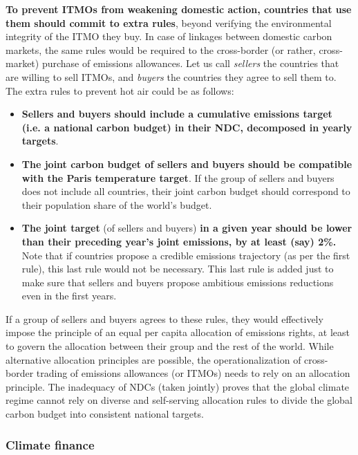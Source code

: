 \documentclass[12pt,english]{article}
\begin{document}
\textbf{To prevent ITMOs from weakening domestic action, countries that use them should commit to extra rules}, beyond verifying the environmental integrity of the ITMO they buy. In case of linkages between domestic carbon markets, the same rules would be required to the cross-border (or rather, cross-market) purchase of emissions allowances. Let us call \textit{sellers} the countries that are willing to sell ITMOs, and \textit{buyers} the countries they agree to sell them to. The extra rules to prevent hot air could be as follows: 
\begin{itemize}
  \item \textbf{Sellers and buyers should include a cumulative emissions target (i.e. a national carbon budget) in their NDC, decomposed in yearly targets}.
  \item \textbf{The joint carbon budget of sellers and buyers should be compatible with the Paris temperature target}. If the group of sellers and buyers does not include all countries, their joint carbon budget should correspond to their population share of the world's budget.
  \item \textbf{The joint target} (of sellers and buyers) \textbf{in a given year should be lower than their preceding year's joint emissions, by at least (say) 2\%.} Note that if countries propose a credible emissions trajectory (as per the first rule), this last rule would not be necessary. This last rule is added just to make sure that sellers and buyers propose ambitious emissions reductions even in the first years. %
\end{itemize}

If a group of sellers and buyers agrees to these rules, they would effectively impose the principle of an equal per capita allocation of emissions rights, at least to govern the allocation between their group and the rest of the world. While alternative allocation principles are possible, the operationalization of cross-border trading of emissions allowances (or ITMOs) needs to rely on an allocation principle. The inadequacy of NDCs (taken jointly) proves that the global climate regime cannot rely on diverse and self-serving allocation rules to divide the global carbon budget into consistent national targets. 


\subsubsection{Climate finance\label{subsubsec:finance}}
\end{document}
